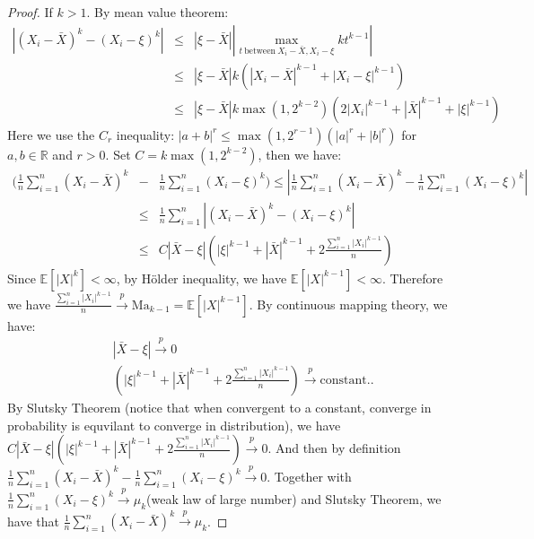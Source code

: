 \documentclass[12pt]{article}
\newcommand{\ep}[1]{\mathbb{E}\left[ #1 \right]}
\newcommand{\cp}{\overset{p}{\to}}
\begin{document}
\begin{enumerate}
\begin{proof}
    If $k > 1$.
    By mean value theorem: 
    \begin{eqnarray}
        |(X_i - \bar{X})^k - (X_i - \xi)^k| &\le& |\xi - \bar{X}| | \max_{t \ \text{between} \ X_i-\bar{X}, X_i-\xi} k t^{k-1} | \\        
                                            &\le& |\xi - \bar{X}| k (|X_i - \bar{X}|^{k-1} + |X_i - \xi|^{k-1}) \\
                                            &\le& |\xi - \bar{X}| k \max(1,2^{k-2}) (2 |X_i|^{k-1} + |\bar{X}|^{k-1} + |\xi|^{k-1})
    \end{eqnarray}
    Here we use the $C_r$ inequality: $|a+b|^r \le \max(1,2^{r-1})(|a|^r + |b|^r)$ for $a,b \in \mathbb{R}$ and $r > 0$.
    Set $C = k \max(1, 2^{k-2})$, then we have:
    \begin{eqnarray}
        (\frac{1}{n}\sum_{i=1}^n (X_i - \bar{X})^k &-& \frac{1}{n}\sum_{i=1}^n (X_i - \xi)^k) \le |\frac{1}{n}\sum_{i=1}^n (X_i - \bar{X})^k - \frac{1}{n}\sum_{i=1}^n (X_i - \xi)^k| \\
                                                                                            &\le& \frac{1}{n} \sum_{i=1}^n |(X_i - \bar{X})^k - (X_i - \xi)^k| \\
                                                                                            &\le& C |\bar{X} - \xi| (|\xi|^{k-1}+|\bar{X}|^{k-1}+2\frac{\sum_{i=1}^n|X_i|^{k-1}}{n})    
    \end{eqnarray}
    Since $\ep{|X|^k} < \infty$, by H\"{o}lder inequality, we have $\ep{|X|^{k-1}} < \infty$. Therefore we have $\frac{\sum_{i=1}^n|X_i|^{k-1}}{n} \cp \text{Ma}_{k-1} = \ep{|X|^{k-1}}$. By continuous mapping theory, we have:
    \begin{eqnarray}
        &&|\bar{X} - \xi| \cp 0 \\
        &&(|\xi|^{k-1}+|\bar{X}|^{k-1}+2\frac{\sum_{i=1}^n|X_i|^{k-1}}{n}) \cp \text{constant..}
    \end{eqnarray}
    By Slutsky Theorem (notice that when convergent to a constant, converge in probability is equvilant to converge in distribution), we have $C |\bar{X} - \xi| (|\xi|^{k-1}+|\bar{X}|^{k-1}+2\frac{\sum_{i=1}^n|X_i|^{k-1}}{n}) \cp 0$.
    And then by definition $\frac{1}{n}\sum_{i=1}^n (X_i - \bar{X})^k - \frac{1}{n}\sum_{i=1}^n (X_i - \xi)^k \cp 0$. Together with $\frac{1}{n}\sum_{i=1}^n (X_i - \xi)^k \cp \mu_k$(weak law of large number) and Slutsky Theorem, we have that $\frac{1}{n}\sum_{i=1}^n (X_i - \bar{X})^k \cp \mu_k$.    
    \end{proof}


\end{enumerate}
\end{document}
